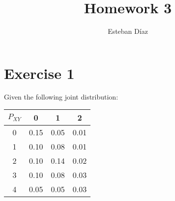 \documentclass[10pt]{article}
\author{Esteban D\'{i}az}
\title{Homework 3}{}
\begin{document}
\maketitle

\section{Exercise 1}

Given the following joint distribution:
\begin{tabular}{c | c  c c }

 $P_{XY}$ & 0     & 1     &  2   \\ \hline
    0     & 0.15  & 0.05  & 0.01 \\ 
    1     & 0.10  & 0.08  & 0.01 \\ 
    2     & 0.10  & 0.14  & 0.02 \\ 
    3     & 0.10  & 0.08  & 0.03 \\ 
    4     & 0.05  & 0.05  & 0.03 \\ 
\end{tabular}
\end{document}
